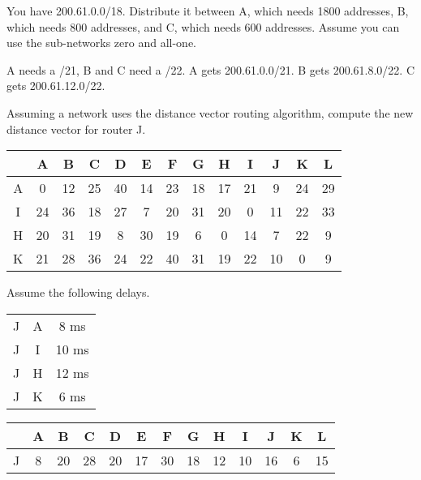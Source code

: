 \begin{Exercise}
You have 200.61.0.0/18. Distribute it between A, which needs 1800 addresses, B, which needs 800 addresses, and C, which needs 600 addresses.
Assume you can use the sub-networks zero and all-one.
\end{Exercise}
\begin{Answer}
A needs a /21, B and C need a /22.
A gets 200.61.0.0/21. B gets 200.61.8.0/22. C gets 200.61.12.0/22.
\end{Answer}

\begin{Exercise}
Assuming a network uses the distance vector routing algorithm, compute the new distance vector for router J.

\begin{center}
\begin{tabular}{c|c|c|c|c|c|c|c|c|c|c|c|c}
      & A & B & C & D & E & F & G & H & I & J & K & L \\ \hline
    A & 0 & 12 & 25 & 40 & 14 & 23 & 18 & 17 & 21 & 9 & 24 & 29 \\
    I & 24 & 36 & 18 & 27 & 7 & 20 & 31 & 20 & 0 & 11 & 22 & 33 \\
    H & 20 & 31 & 19 & 8 & 30 & 19 & 6 & 0 & 14 & 7 & 22 & 9 \\
    K & 21 & 28 & 36 & 24 & 22 & 40 & 31 & 19 & 22 & 10 & 0 & 9
\end{tabular}
\end{center}

Assume the following delays.

\begin{center}
\begin{tabular}{c|c|c}
    J & A &  8 ms \\
    J & I & 10 ms \\
    J & H & 12 ms \\
    J & K &  6 ms
\end{tabular}
\end{center}
\end{Exercise}
\begin{Answer}
\begin{center}
\begin{tabular}{c|c|c|c|c|c|c|c|c|c|c|c|c}
      & A & B & C & D & E & F & G & H & I & J & K & L \\ \hline
    J & 8 & 20 & 28 & 20 & 17 & 30 & 18 & 12 & 10 & 16 & 6 & 15
\end{tabular}
\end{center}
\end{Answer}

